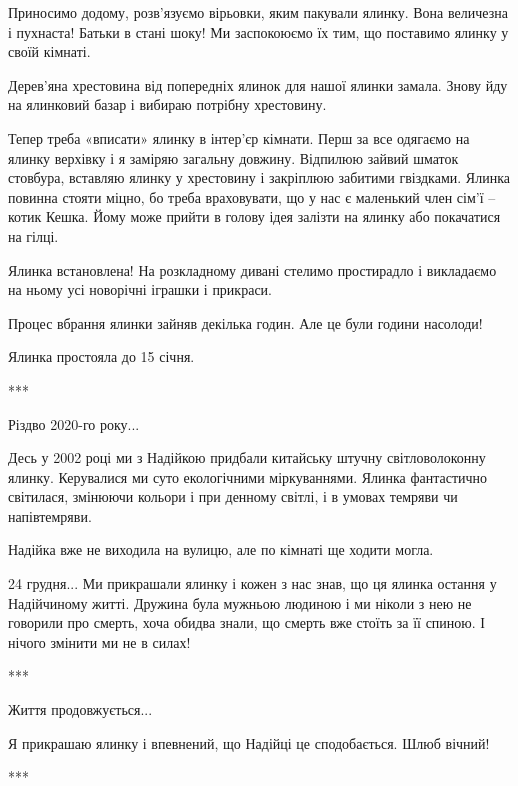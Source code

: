 
Приносимо додому, розв’язуємо вірьовки, яким пакували ялинку. Вона величезна і
пухнаста! Батьки в стані шоку! Ми заспокоюємо їх тим, що поставимо ялинку у
своїй кімнаті.


Дерев’яна хрестовина від попередніх ялинок для нашої ялинки замала. Знову йду
на ялинковий базар і вибираю потрібну хрестовину. 

Тепер треба «вписати» ялинку в інтер’єр кімнати. Перш за все одягаємо на ялинку
верхівку і я заміряю загальну довжину. Відпилюю зайвий шматок стовбура,
вставляю ялинку у хрестовину і закріплюю забитими гвіздками. Ялинка повинна
стояти міцно, бо треба враховувати, що у нас є маленький член сім’ї – котик
Кешка. Йому може прийти в голову ідея залізти на ялинку або покачатися на
гілці. 


Ялинка встановлена! На розкладному дивані стелимо простирадло і викладаємо на
ньому усі новорічні іграшки і прикраси. 

Процес вбрання ялинки зайняв декілька годин. Але це були години насолоди!

Ялинка простояла до 15 січня.


***

Різдво 2020-го року...

Десь у 2002 році ми з Надійкою придбали китайську штучну світловолоконну
ялинку. Керувалися ми суто екологічними міркуваннями. Ялинка фантастично
світилася, змінюючи кольори і при денному світлі, і в умовах темряви чи
напівтемряви. 


Надійка вже не виходила на вулицю, але по кімнаті ще ходити могла. 

24 грудня... Ми прикрашали ялинку і кожен з нас знав, що ця ялинка остання у
Надійчиному житті. Дружина була мужньою людиною і ми ніколи з нею не говорили
про смерть, хоча обидва знали, що смерть вже стоїть за її спиною. І нічого
змінити ми не в силах!


***

Життя продовжується... 

Я прикрашаю ялинку і впевнений, що Надійці це сподобається. Шлюб вічний!

***


